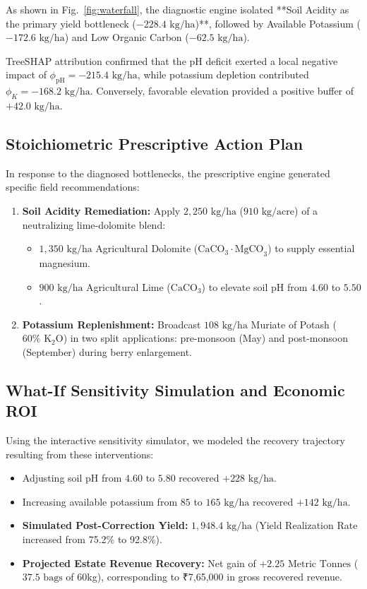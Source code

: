 \documentclass[conference]{IEEEtran}
\begin{document}
As shown in Fig.~\ref{fig:waterfall}, the diagnostic engine isolated **Soil Acidity as the primary yield bottleneck ($-228.4\text{ kg/ha}$)**, followed by Available Potassium ($-172.6\text{ kg/ha}$) and Low Organic Carbon ($-62.5\text{ kg/ha}$). 

TreeSHAP attribution confirmed that the pH deficit exerted a local negative impact of $\phi_{\text{pH}} = -215.4\text{ kg/ha}$, while potassium depletion contributed $\phi_K = -168.2\text{ kg/ha}$. Conversely, favorable elevation provided a positive buffer of $+42.0\text{ kg/ha}$.

\subsection{Stoichiometric Prescriptive Action Plan}
In response to the diagnosed bottlenecks, the prescriptive engine generated specific field recommendations:
\begin{enumerate}
    \item \textbf{Soil Acidity Remediation:} Apply $2,250\text{ kg/ha}$ ($910\text{ kg/acre}$) of a neutralizing lime-dolomite blend:
    \begin{itemize}
        \item $1,350\text{ kg/ha}$ Agricultural Dolomite ($\text{CaCO}_3 \cdot \text{MgCO}_3$) to supply essential magnesium.
        \item $900\text{ kg/ha}$ Agricultural Lime ($\text{CaCO}_3$) to elevate soil pH from $4.60$ to $5.50$.
    \end{itemize}
    \item \textbf{Potassium Replenishment:} Broadcast $108\text{ kg/ha}$ Muriate of Potash ($60\%\text{ K}_2\text{O}$) in two split applications: pre-monsoon (May) and post-monsoon (September) during berry enlargement.
\end{enumerate}

\subsection{What-If Sensitivity Simulation and Economic ROI}
Using the interactive sensitivity simulator, we modeled the recovery trajectory resulting from these interventions:
\begin{itemize}
    \item Adjusting soil pH from $4.60$ to $5.80$ recovered $+228\text{ kg/ha}$.
    \item Increasing available potassium from $85$ to $165\text{ kg/ha}$ recovered $+142\text{ kg/ha}$.
    \item \textbf{Simulated Post-Correction Yield:} $1,948.4\text{ kg/ha}$ (Yield Realization Rate increased from 75.2\% to 92.8\%).
    \item \textbf{Projected Estate Revenue Recovery:} Net gain of $+2.25\text{ Metric Tonnes}$ ($37.5\text{ bags}$ of 60kg), corresponding to ₹7,65,000 in gross recovered revenue.
\end{itemize}
\end{document}
